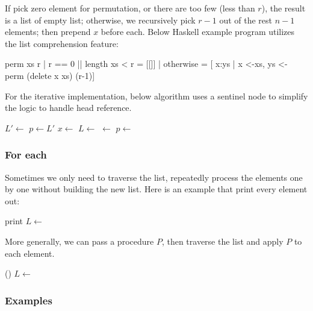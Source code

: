 \documentclass[b5paper]{article}
\begin{document}
If pick zero element for permutation, or there are too few (less than $r$), the result is a list of empty list; otherwise, we recursively pick $r-1$ out of the rest $n-1$ elements; then prepend $x$ before each. Below Haskell example program utilizes the list comprehension feature:

\begin{Haskell}
perm xs r | r == 0 || length xs < r = [[]]
          | otherwise = [ x:ys | x <-xs,
                                 ys <- perm (delete x xs) (r-1)]
\end{Haskell}

For the iterative  implementation, below algorithm uses a sentinel node to simplify the logic to handle head reference.

\begin{algorithmic}[1]
  \State $L' \gets$  
  \State $p \gets L'$
    \State $x \gets$ 
    \State $L \gets$ 
    \State {} $\gets$ 
    \State $p \gets$ 
  \EndWhile
  \State \Return {} 
\EndFunction
\end{algorithmic}

\subsubsection{For each}

Sometimes we only need to traverse the list, repeatedly process the elements one by one without building the new list. Here is an example that print every element out:

\begin{algorithmic}[1]
    \State print 
    \State $L \gets$ 
  \EndWhile
\EndFunction
\end{algorithmic}

More generally, we can pass a procedure $P$, then traverse the list and apply $P$ to each element.

\begin{algorithmic}[1]
    \State {}()
    \State $L \gets$ 
  \EndWhile
\EndFunction
\end{algorithmic}

\subsubsection{Examples}
\end{document}
